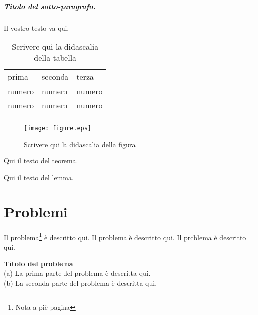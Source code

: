 \subparagraph{Titolo del sotto-paragrafo.} Il vostro testo va qui.%
%
%
%
\begin{table}
\centering
\caption{Scrivere qui la didascalia della tabella}
\label{tab:1}       %
%
%
\begin{tabular}{lll}
\hline\noalign{\smallskip}
prima & seconda & terza  \\
\noalign{\smallskip}\hline\noalign{\smallskip}
numero & numero & numero \\
numero & numero & numero \\
\noalign{\smallskip}\hline
\end{tabular}
\end{table}
%
%
%
\begin{figure}
\centering
\texttt{[image: figure.eps]}
%
%
\caption{Scrivere qui la didascalia della figura}
\label{fig:1}       %
\end{figure}
%
%
\begin{theorem}
Qui il testo del teorema.
\end{theorem}
%
%
\begin{lemma}
Qui il testo del lemma.
\end{lemma}
%
%
\section*{Problemi}
%
\begin{prob}
\label{prob1}
Il problema\footnote{Nota a pi\`{e} pagina} \`{e} descritto qui. Il problema \`{e} descritto qui. Il problema \`{e} descritto qui. \end{prob}

\begin{prob}
\label{prob2}
\textbf{Titolo del problema}\\
(a) La prima parte del problema \`{e} descritta qui.\\
(b) La seconda parte del problema \`{e} descritta qui.
\end{prob}



%
